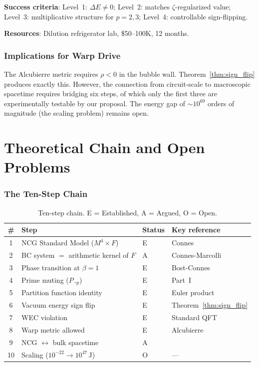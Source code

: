 \documentclass[11pt,a4paper]{article}
\begin{document}
\textbf{Success criteria}:
Level~1: $\Delta E \neq 0$;
Level~2: matches $\zeta$-regularized value;
Level~3: multiplicative structure for $p=2,3$;
Level~4: controllable sign-flipping.

\textbf{Resources}: Dilution refrigerator lab, \$50--100K, 12 months.

\section{Implications for Warp Drive}

The Alcubierre metric requires $\rho < 0$ in the bubble wall.
Theorem~\ref{thm:sign_flip} produces exactly this.
However, the connection from circuit-scale to macroscopic spacetime
requires bridging six steps, of which only the first three are
experimentally testable by our proposal. The energy gap of
$\sim 10^{69}$ orders of magnitude (the scaling problem) remains open.

\newpage
\part{Theoretical Chain and Open Problems}
\label{part:chain}

\section{The Ten-Step Chain}

\begin{table}[h]
\centering
\caption{Ten-step chain. E = Established, A = Argued, O = Open.}
\label{tab:chain}
\small
\begin{tabular}{@{}clll@{}}
\toprule
\# & Step & Status & Key reference \\
\midrule
1 & NCG Standard Model ($M^4 \times F$) & E & Connes~\cite{Connes1996} \\
2 & BC system $=$ arithmetic kernel of $F$ & A & Connes-Marcolli~\cite{ConnesMarcolli2006} \\
3 & Phase transition at $\beta = 1$ & E & Bost-Connes~\cite{BostConnes1995} \\
4 & Prime muting ($P_{\neg p}$) & E & Part~I \\
5 & Partition function identity & E & Euler product \\
6 & Vacuum energy sign flip & E & Theorem~\ref{thm:sign_flip} \\
7 & WEC violation & E & Standard QFT \\
8 & Warp metric allowed & E & Alcubierre~\cite{Alcubierre1994} \\
9 & NCG $\leftrightarrow$ bulk spacetime & A & \cite{ConnesMarcolli2006,Maldacena1998} \\
10 & Scaling ($10^{-22}\to 10^{47}\,$J) & O & --- \\
\bottomrule
\end{tabular}
\end{table}
\end{document}

